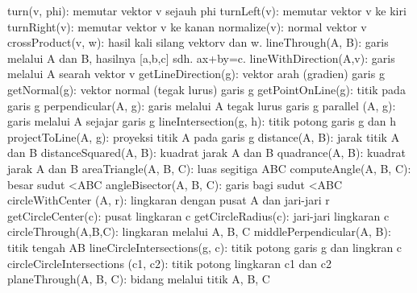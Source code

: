 \documentclass[a4paper,10pt]{article}
\begin{document}
\begin{eulernotebook}
\begin{eulercomment}
\begin{eulercomment}
\begin{eulercomment}
\begin{eulercomment}
\begin{eulercomment}
\begin{eulercomment}
\begin{eulercomment}
\begin{eulercomment}
\begin{eulercomment}
\begin{eulercomment}
\begin{eulercomment}
\begin{eulercomment}
\begin{eulercomment}
\begin{eulercomment}
\begin{eulercomment}
\begin{eulercomment}
\begin{eulercomment}
\begin{eulercomment}
\begin{eulercomment}
\begin{eulercomment}
\begin{eulercomment}
\begin{eulercomment}
\begin{eulercomment}
\begin{eulercomment}
\begin{eulercomment}
\begin{eulercomment}
\begin{eulercomment}
\begin{eulercomment}
\begin{eulercomment}
\begin{eulercomment}
\begin{eulercomment}
\begin{eulercomment}
\begin{eulercomment}
\begin{eulercomment}
\begin{eulercomment}
\begin{eulercomment}
\begin{eulercomment}
\begin{eulercomment}
\begin{eulercomment}
\end{eulercomment}
\begin{eulerttcomment}
  turn(v, phi): memutar vektor v sejauh phi
  turnLeft(v):   memutar vektor v ke kiri
  turnRight(v):  memutar vektor v ke kanan
  normalize(v): normal vektor v
  crossProduct(v, w): hasil kali silang vektorv dan w.
  lineThrough(A, B): garis melalui A dan B, hasilnya [a,b,c] sdh. ax+by=c.
  lineWithDirection(A,v): garis melalui A searah vektor v
  getLineDirection(g): vektor arah (gradien) garis g
  getNormal(g): vektor normal (tegak lurus) garis g
  getPointOnLine(g):  titik pada garis g
  perpendicular(A, g):  garis melalui A tegak lurus garis g
  parallel (A, g):  garis melalui A sejajar garis g
  lineIntersection(g, h):  titik potong garis g dan h
  projectToLine(A, g):   proyeksi titik A pada garis g
  distance(A, B):  jarak titik A dan B
  distanceSquared(A, B):  kuadrat jarak A dan B
  quadrance(A, B): kuadrat jarak A dan B
  areaTriangle(A, B, C):  luas segitiga ABC
  computeAngle(A, B, C):   besar sudut <ABC
  angleBisector(A, B, C): garis bagi sudut <ABC
  circleWithCenter (A, r): lingkaran dengan pusat A dan jari-jari r
  getCircleCenter(c):  pusat lingkaran c
  getCircleRadius(c):  jari-jari lingkaran c
  circleThrough(A,B,C):  lingkaran melalui A, B, C
  middlePerpendicular(A, B): titik tengah AB
  lineCircleIntersections(g, c): titik potong garis g dan lingkran c
  circleCircleIntersections (c1, c2):  titik potong lingkaran c1 dan c2
  planeThrough(A, B, C):  bidang melalui titik A, B, C
\end{eulerttcomment}
\begin{eulercomment}


\end{eulercomment}
\end{eulercomment}
\end{eulercomment}
\end{eulercomment}
\end{eulercomment}
\end{eulercomment}
\end{eulercomment}
\end{eulercomment}
\end{eulercomment}
\end{eulercomment}
\end{eulercomment}
\end{eulercomment}
\end{eulercomment}
\end{eulercomment}
\end{eulercomment}
\end{eulercomment}
\end{eulercomment}
\end{eulercomment}
\end{eulercomment}
\end{eulercomment}
\end{eulercomment}
\end{eulercomment}
\end{eulercomment}
\end{eulercomment}
\end{eulercomment}
\end{eulercomment}
\end{eulercomment}
\end{eulercomment}
\end{eulercomment}
\end{eulercomment}
\end{eulercomment}
\end{eulercomment}
\end{eulercomment}
\end{eulercomment}
\end{eulercomment}
\end{eulercomment}
\end{eulercomment}
\end{eulercomment}
\end{eulercomment}
\end{eulernotebook}
\end{document}

